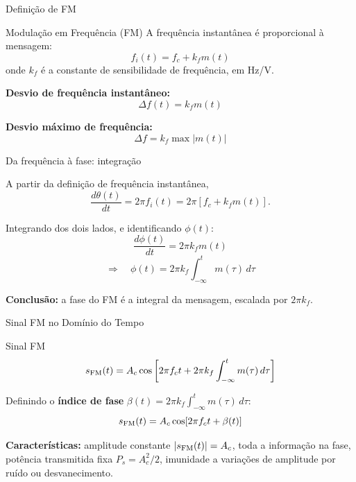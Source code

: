 \begin{frame}{Definição de FM}

\begin{block}{Modulação em Frequência (FM)}
A frequência instantânea é proporcional à mensagem:
\[
f_i(t) = f_c + k_f m(t)
\]
onde $k_f$ é a constante de sensibilidade de frequência, em Hz/V.
\end{block}

\textbf{Desvio de frequência instantâneo:}
\[
\Delta f(t) = k_f m(t)
\]

\textbf{Desvio máximo de frequência:}
\[
\Delta f = k_f \max|m(t)|
\]

\end{frame}


\begin{frame}{Da frequência à fase: integração}

A partir da definição de frequência instantânea,
\[
\frac{d\theta(t)}{dt} = 2\pi f_i(t) = 2\pi[f_c + k_f m(t)].
\]

\pause
Integrando dos dois lados, e identificando $\phi(t)$:
\[
\frac{d\phi(t)}{dt} = 2\pi k_f m(t)
\]
\[
\Rightarrow \quad \phi(t) = 2\pi k_f \int_{-\infty}^{t} m(\tau)\,d\tau
\]

\pause
\textbf{Conclusão:} a fase do FM é a integral da mensagem, escalada por $2\pi k_f$.

\end{frame}


\begin{frame}{Sinal FM no Domínio do Tempo}

\begin{block}{Sinal FM}
\[
s_{\text{FM}}(t) = A_c \cos\left[2\pi f_c t + 2\pi k_f \int_{-\infty}^{t} m(\tau)\,d\tau\right]
\]
\end{block}

Definindo o \textbf{índice de fase} $\beta(t) = 2\pi k_f \int_{-\infty}^{t} m(\tau)\,d\tau$:
\[
s_{\text{FM}}(t) = A_c \cos[2\pi f_c t + \beta(t)]
\]

\pause
\small
\textbf{Características:} amplitude constante $|s_{\text{FM}}(t)| = A_c$, toda a informação na fase, potência transmitida fixa $P_s = A_c^2/2$, imunidade a variações de amplitude por ruído ou desvanecimento.

\end{frame}


